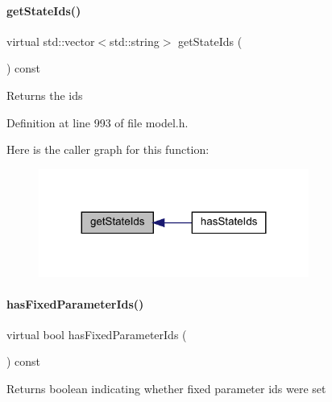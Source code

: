 \paragraph{\texorpdfstring{get\+State\+Ids()}{getStateIds()}}
{\footnotesize\ttfamily virtual std\+::vector$<$std\+::string$>$ get\+State\+Ids (\begin{DoxyParamCaption}{ }\end{DoxyParamCaption}) const\hspace{0.3cm}{\ttfamily [virtual]}}

\begin{DoxyReturn}{Returns}
the ids 
\end{DoxyReturn}


Definition at line 993 of file model.\+h.

Here is the caller graph for this function\+:
\nopagebreak
\begin{figure}[H]
\begin{center}
\leavevmode
\includegraphics[width=251pt]{classamici_1_1_model_a8a93b9fcddaaa762dacc654ffc379af1_icgraph}
\end{center}
\end{figure}
\mbox{\label{classamici_1_1_model_af6cb68d368b1288fa0d7515242bf7a5b}} 
\paragraph{\texorpdfstring{has\+Fixed\+Parameter\+Ids()}{hasFixedParameterIds()}}
{\footnotesize\ttfamily virtual bool has\+Fixed\+Parameter\+Ids (\begin{DoxyParamCaption}{ }\end{DoxyParamCaption}) const\hspace{0.3cm}{\ttfamily [virtual]}}

\begin{DoxyReturn}{Returns}
boolean indicating whether fixed parameter ids were set 
\end{DoxyReturn}


